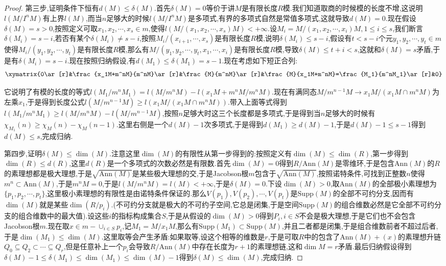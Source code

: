 \begin{proof}
	第三步,证明条件下恒有$d(M)\le\delta(M)$.首先$\delta(M)=0$等价于讲$M$是有限长度$R$模.我们知道取商的时候模的长度不增,这说明$l(M/I^nM)$有上界$l(M)$,而当$n$足够大的时候$l(M/I^nM)$是多项式,有界的多项式自然是常值多项式,这就导致$d(M)=0$.现在假设$\delta(M)=s>0$,按照定义可取$x_1,x_2,\cdots,x_s\in m$,使得$l(M/(x_1,x_2,\cdots,x_s)M)<+\infty$.设$M_i=M/(x_1,x_2,\cdots,x_i)M,1\le i\le s$,我们断言$\delta(M_i)=s-i$,若否有某个$\delta(M_i)\not=s-i$,按照$M_i/(x_{i+1},\cdots,x_s)$是有限长度$R$模,说明$\delta(M_i)\le s-i$,假设有$t<s-i$个元$y_1,y_2,\cdots,y_t\in m$使得$M_i/(y_1,y_2,\cdots,y_t)$是有限长度$R$模,那么有$M/(y_1,y_2,\cdots,y_t,x_1,\cdots,x_i)$是有限长度$R$模,导致$\delta(M)\le t+i<s$,这就和$\delta(M)=s$矛盾,于是有$\delta(M_i)=s-i$.现在按照归纳假设,有$d(M_1)\le\delta(M_1)=s-1$.现在考虑如下短正合列:
	$$\xymatrix{0\ar[r]&\frac{x_1M+m^nM}{m^nM}\ar[r]&\frac{M}{m^nM}\ar[r]&\frac{M}{x_1M+m^nM}=\frac{M_1}{m^nM_1}\ar[r]&0}$$
	
	它说明了有模的长度的等式$l(M_1/m^nM_1)=l(M/m^nM)-l(x_1M+m^nM/m^nM)$.现在有满同态$M/m^{n-1}M\to x_1M/(x_1M\cap m^nM)$为左乘$x_1$,于是得到长度公式$l(M/m^{n-1}M)\ge l(x_1M/(x_1M\cap m^nM))$.带入上面等式得到$l(M_1/m^nM_1)\ge l(M/m^nM)-l(M/m^{n-1}M)$,按照$n$足够大时这三个长度都是多项式,于是得到当$n$足够大的时候有$\chi_{M_1}(n)\ge\chi_M(n)-\chi_M(n-1)$.这里右侧是一个$d(M)-1$次多项式,于是得到$d(M_1)\ge d(M)-1$,于是$d(M)-1\le s-1$得到$d(M)\le s$,完成归纳.
	
	第四步,证明$\delta(M)\le\dim(M)$.注意这里$\dim(M)$的有限性从第一步得到的:按照定义有$\dim(M)\le\dim(R)$,第一步得到$\dim(R)\le d(R)$,这里$d(R)$是一个多项式的次数必然是有限数.首先$\dim(M)=0$得到$R/\mathrm{Ann}(M)$是零维环,于是包含$\mathrm{Ann}(M)$的$R$的素理想都是极大理想,于是$\sqrt{\mathrm{Ann}(M)}$是某些极大理想的交,于是Jacobson根$m$包含于$\sqrt{\mathrm{Ann}(M)}$,按照诺特条件,可找到正整数$n$使得$m^n\subset\mathrm{Ann}(M)$,于是$m^nM=0$,于是$l(M/m^nM)=l(M)<+\infty$,于是$\delta(M)=0$.下设$\dim(M)>0$,取$\mathrm{Ann}(M)$的全部极小素理想为$\{p_1,p_2,\cdots,p_t\}$,这里极小素理想的有限性是由诺特条件保证的.那么$V(p_1),V(p_2),\cdots,V(p_t)$是$\mathrm{Supp}(M)$的全部不可约分支,因而有$\dim(M)$就是某些$\dim(R/p_i)$.(不可约分支就是极大的不可约子空间,它总是闭集,于是空间$\mathrm{Supp}(M)$的组合维数必然是它全部不可约分支的组合维数中的最大值).设这些$i$的指标构成集合$S$,于是从假设的$\dim(M)>0$得到$P_i,i\in S$不会是极大理想,于是它们也不会包含Jacobson根$m$.现在取$x\in m-\cup_{i\in S}p_i$,记$M_1=M/x_1M$,那么有$\mathrm{Supp}(M_1)\subset\mathrm{Supp}(M)$,并且二者都是闭集,于是组合维数前者不超过后者,于是$\dim(M_1)\le\dim(M)$.这里取等会产生矛盾:如果取等,设这个相等的维数是$r$,于是可取$R$中的包含了$\mathrm{Ann}(M)+(x)$的素理想升链$Q_0\subseteq Q_2\subset\cdots\subseteq Q_r$,但是任意补上一个$p_i$会导致$R/\mathrm{Ann}(M)$中存在长度为$r+1$的素理想链,这和$\dim M=r$矛盾.最后归纳假设得到$\delta(M)-1\le\delta(M_1)\le\dim(M_1)\le\dim(M)-1$得到$\delta(M)\le\dim(M)$,完成归纳.
\end{proof}

